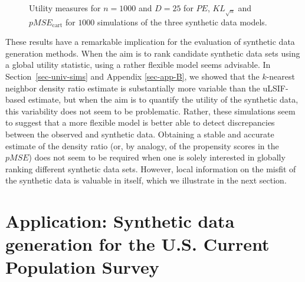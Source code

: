 \documentclass[
]{article}
\begin{document}
\begin{figure}[t]


\caption{\label{fig-sim2-results}Utility measures for \(n = 1000\) and
\(D = 25\) for \(PE\), \(KL_{\sqrt{n}}\) and \(pMSE_{\text{cart}}\) for
\(1000\) simulations of the three synthetic data models.}

\end{figure}%

\linespread{2}

These results have a remarkable implication for the evaluation of
synthetic data generation methods. When the aim is to rank candidate
synthetic data sets using a global utility statistic, using a rather
flexible model seems advisable. In Section~\ref{sec-univ-sims} and
Appendix \ref{sec-app-B}, we showed that the \(k\)-nearest neighbor
density ratio estimate is substantially more variable than the
uLSIF-based estimate, but when the aim is to quantify the utility of the
synthetic data, this variability does not seem to be problematic.
Rather, these simulations seem to suggest that a more flexible model is
better able to detect discrepancies between the observed and synthetic
data. Obtaining a stable and accurate estimate of the density ratio (or,
by analogy, of the propensity scores in the \(pMSE\)) does not seem to
be required when one is solely interested in globally ranking different
synthetic data sets. However, local information on the misfit of the
synthetic data is valuable in itself, which we illustrate in the next
section.

\section{Application: Synthetic data generation for the U.S. Current
Population Survey}\label{sec-app}
\end{document}
